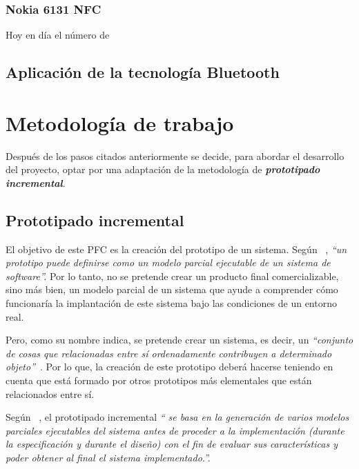     \subsubsection{Nokia 6131 \acs{NFC}}
  Hoy en día el número de

  \subsection{Aplicación de la tecnología Bluetooth}

\section{Metodología de trabajo}
\label{sec:workingMethodology}
Después de los pasos citados anteriormente se decide, para abordar el
desarrollo del proyecto, optar por una adaptación de la metodología de 
\emph{\textbf{prototipado incremental}}.

  \subsection{Prototipado incremental}
El objetivo de este \acs{PFC} es la creación del prototipo de un sistema.
Según ~\cite{bib:software_engineering}, \emph{``un prototipo puede definirse
como  un modelo parcial ejecutable de un sistema de software''.} Por lo tanto, 
no se pretende crear un producto final comercializable, sino más bien, un
modelo parcial de un sistema que ayude a comprender cómo funcionaría la
implantación de este sistema bajo las condiciones de un entorno real.

Pero, como su nombre indica, se pretende crear un sistema, es decir, un
\emph{``conjunto de cosas que relacionadas entre sí ordenadamente contribuyen 
a determinado objeto''}~\cite{bib:rae}. Por lo que, la creación de este 
prototipo deberá hacerse teniendo en cuenta que está formado por otros 
prototipos más elementales que están relacionados entre sí.

Según ~\cite{bib:software_engineering}, el prototipado incremental \emph{``
se basa en la generación de varios modelos parciales ejecutables del sistema 
antes de proceder a la implementación (durante la especificación y durante el 
diseño) con el fin de evaluar sus características y poder obtener al final el 
sistema implementado.''.}

